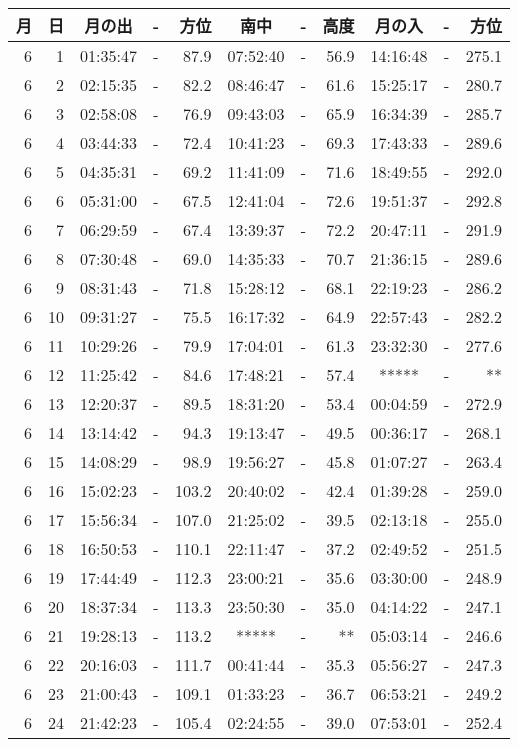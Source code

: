 \documentclass[12pt,a4j]{jsarticle}
\begin{document}
\begin{table}[htb]
\begin{center}
\begin{tabular}{rr|ccr|ccr|ccr}
 月& 日 & 月の出 &-& 方位 & 南中 &-& 高度 & 月の入 &-& 方位 \\ 
\hline
 6& 1&01:35:47&-& 87.9&07:52:40&-&56.9&14:16:48&-&275.1\\ 
 6& 2&02:15:35&-& 82.2&08:46:47&-&61.6&15:25:17&-&280.7\\ 
 6& 3&02:58:08&-& 76.9&09:43:03&-&65.9&16:34:39&-&285.7\\ 
 6& 4&03:44:33&-& 72.4&10:41:23&-&69.3&17:43:33&-&289.6\\ 
 6& 5&04:35:31&-& 69.2&11:41:09&-&71.6&18:49:55&-&292.0\\ 
 6& 6&05:31:00&-& 67.5&12:41:04&-&72.6&19:51:37&-&292.8\\ 
 6& 7&06:29:59&-& 67.4&13:39:37&-&72.2&20:47:11&-&291.9\\ 
 6& 8&07:30:48&-& 69.0&14:35:33&-&70.7&21:36:15&-&289.6\\ 
 6& 9&08:31:43&-& 71.8&15:28:12&-&68.1&22:19:23&-&286.2\\ 
 6&10&09:31:27&-& 75.5&16:17:32&-&64.9&22:57:43&-&282.2\\ 
 6&11&10:29:26&-& 79.9&17:04:01&-&61.3&23:32:30&-&277.6\\ 
 6&12&11:25:42&-& 84.6&17:48:21&-&57.4&  *****  &-& ** \\ 
 6&13&12:20:37&-& 89.5&18:31:20&-&53.4&00:04:59&-&272.9\\ 
 6&14&13:14:42&-& 94.3&19:13:47&-&49.5&00:36:17&-&268.1\\ 
 6&15&14:08:29&-& 98.9&19:56:27&-&45.8&01:07:27&-&263.4\\ 
 6&16&15:02:23&-&103.2&20:40:02&-&42.4&01:39:28&-&259.0\\ 
 6&17&15:56:34&-&107.0&21:25:02&-&39.5&02:13:18&-&255.0\\ 
 6&18&16:50:53&-&110.1&22:11:47&-&37.2&02:49:52&-&251.5\\ 
 6&19&17:44:49&-&112.3&23:00:21&-&35.6&03:30:00&-&248.9\\ 
 6&20&18:37:34&-&113.3&23:50:30&-&35.0&04:14:22&-&247.1\\ 
 6&21&19:28:13&-&113.2&  *****  &-& ** &05:03:14&-&246.6\\ 
 6&22&20:16:03&-&111.7&00:41:44&-&35.3&05:56:27&-&247.3\\ 
 6&23&21:00:43&-&109.1&01:33:23&-&36.7&06:53:21&-&249.2\\ 
 6&24&21:42:23&-&105.4&02:24:55&-&39.0&07:53:01&-&252.4\\ 

\end{tabular}
\end{center}
\end{table}
\end{document}
